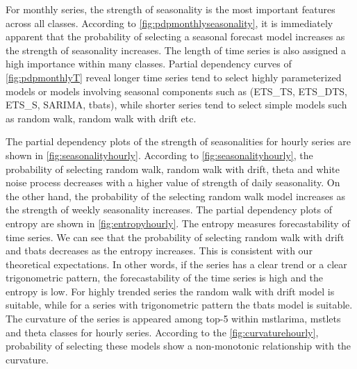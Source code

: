 \documentclass[11pt,a4paper,]{article}
\begin{document}
For monthly series, the strength of seasonality is the most important features across all classes. According to \autoref{fig:pdpmonthlyseasonality}, it is immediately apparent that the probability of selecting a seasonal forecast model increases as the strength of seasonality increases. The length of time series is also assigned a high importance within many classes. Partial dependency curves of \autoref{fig:pdpmonthlyT} reveal longer time series tend to select highly parameterized models or models involving seasonal components such as (ETS\_TS, ETS\_DTS, ETS\_S, SARIMA, tbats), while shorter series tend to select simple models such as random walk, random walk with drift etc.

The partial dependency plots of the strength of seasonalities for hourly series are shown in \autoref{fig:seasonalityhourly}. According to \autoref{fig:seasonalityhourly}, the probability of selecting random walk, random walk with drift, theta and white noise process decreases with a higher value of strength of daily seasonality. On the other hand, the probability of the selecting random walk model increases as the strength of weekly seasonality increases. The partial dependency plots of entropy are shown in \autoref{fig:entropyhourly}. The entropy measures forecastability of time series. We can see that the probability of selecting random walk with drift and tbats decreases as the entropy increases. This is consistent with our theoretical expectations. In other words, if the series has a clear trend or a clear trigonometric pattern, the forecastability of the time series is high and the entropy is low. For highly trended series the random walk with drift model is suitable, while for a series with trigonometric pattern the tbats model is suitable. The curvature of the series is appeared among top-5 within mstlarima, mstlets and theta classes for hourly series. According to the \autoref{fig:curvaturehourly}, probability of selecting these models show a non-monotonic relationship with the curvature.
\end{document}
